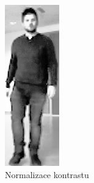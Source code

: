 \begin{figure}[H]
\begin{minipage}{.3\textwidth}
  \includegraphics[width=.5\linewidth]{figures/hog_histogram_before}
  \caption*{Normalizace kontrastu}
  \label{fig:hog_contrast}
\end{minipage}%
\begin{minipage}{.3\textwidth}
  \centering

\end{minipage}
\end{figure}
